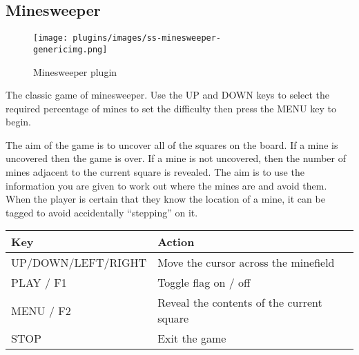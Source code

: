 \subsection{Minesweeper}
\begin{figure}[h!]
\begin{center}
\texttt{[image: plugins/images/ss-minesweeper-\\genericimg.png]}
\end{center}
\caption{Minesweeper plugin}
\end{figure}

The classic game of minesweeper.  Use the UP and DOWN keys to select the
required percentage of mines to set the difficulty then press the MENU
key to begin.

The aim of the game is to uncover all of the squares on the board.  If a
mine is uncovered then the game is over.  If a mine is not uncovered,
then the number of mines adjacent to the current square is revealed. 
The aim is to use the information you are given to work out where the
mines are and avoid them.  When the player is certain that they know
the location of a mine, it can be tagged to avoid accidentally
``stepping'' on it.

\begin{table}[h!]
\begin{tabular}{@{}ll@{}}\toprule
\textbf{Key} & \textbf{Action} \\\midrule
UP/DOWN/LEFT/RIGHT & Move the cursor across the minefield \\
PLAY / F1 & Toggle flag on / off \\
MENU / F2 & Reveal the contents of the current square \\
STOP & Exit the game \\\bottomrule
\end{tabular}
\end{table}
